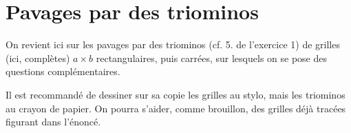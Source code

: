 \section*{Pavages par des triominos}

On revient ici sur les pavages par des triominos (cf. 5. de l'exercice 1) de grilles (ici, complètes) $a \times b$ rectangulaires, puis carrées, sur lesquels on se pose des questions complémentaires.

Il est recommandé de dessiner sur sa copie les grilles au stylo, mais les triominos au crayon de papier. On pourra s'aider, comme brouillon, des grilles déjà tracées figurant dans l'énoncé.


\medskip

\begin{center}
\end{center}


